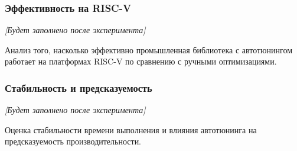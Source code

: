 \subsubsection{Эффективность на RISC-V}

\textit{[Будет заполнено после эксперимента]}

Анализ того, насколько эффективно промышленная библиотека с автотюнингом работает на платформах RISC-V по сравнению с ручными оптимизациями.

\subsubsection{Стабильность и предсказуемость}

\textit{[Будет заполнено после эксперимента]}

Оценка стабильности времени выполнения и влияния автотюнинга на предсказуемость производительности.